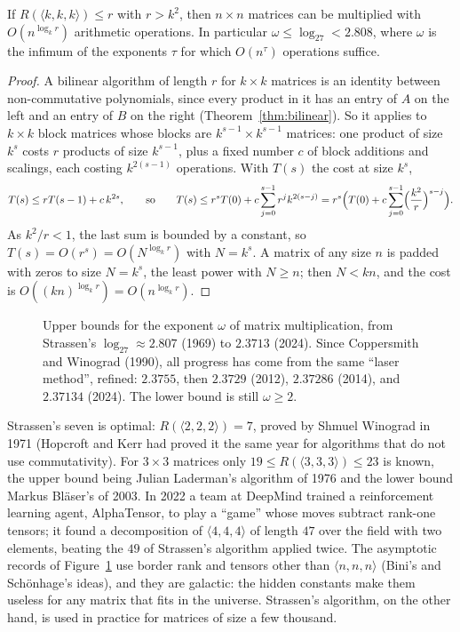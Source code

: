 \begin{theorem}\label{thm:omega}
If $R(\langle k,k,k\rangle)\le r$ with $r>k^2$, then $n\times n$ matrices can be multiplied with $O(n^{\log_kr})$ arithmetic operations.
In particular $\omega\le\log_27<2.808$, where $\omega$ is the infimum of the exponents $\tau$ for which $O(n^\tau)$ operations suffice.
\end{theorem}
\begin{proof}
A bilinear algorithm of length $r$ for $k\times k$ matrices is an identity between non-commutative polynomials, since every product
in it has an entry of $A$ on the left and an entry of $B$ on the right (Theorem~\ref{thm:bilinear}). So it applies to $k\times k$
block matrices whose blocks are $k^{s-1}\times k^{s-1}$ matrices: one product of size $k^s$ costs $r$ products of size $k^{s-1}$, plus
a fixed number $c$ of block additions and scalings, each costing $k^{2(s-1)}$ operations. With $T(s)$ the cost at size $k^s$,
\[
T(s)\le rT(s-1)+c\,k^{2s},\qquad\text{so}\qquad T(s)\le r^sT(0)+c\sum_{j=0}^{s-1}r^jk^{2(s-j)}=r^s\Bigl(T(0)+c\sum_{j=0}^{s-1}\Bigl(\frac{k^2}r
\Bigr)^{s-j}\Bigr).
\]
As $k^2/r<1$, the last sum is bounded by a constant, so $T(s)=O(r^s)=O(N^{\log_kr})$ with $N=k^s$. A matrix of any size $n$ is padded
with zeros to size $N=k^s$, the least power with $N\ge n$; then $N<kn$, and the cost is $O((kn)^{\log_kr})=O(n^{\log_kr})$.
\end{proof}

\begin{figure}[ht]
\centering
{}
\caption{Upper bounds for the exponent $\omega$ of matrix multiplication, from Strassen's $\log_27\approx2.807$ (1969) to $2.3713$
(2024). Since Coppersmith and Winograd (1990), all progress has come from the same ``laser method'', refined: $2.3755$, then
$2.3729$ (2012), $2.37286$ (2014), and $2.37134$ (2024). The lower bound is still $\omega\ge2$.}
\label{fig:omega}
\end{figure}

\begin{remark}
Strassen's seven is optimal: $R(\langle2,2,2\rangle)=7$, proved by Shmuel Winograd in 1971 (Hopcroft and Kerr had proved it the same
year for algorithms that do not use commutativity). For $3\times3$ matrices only $19\le R(\langle3,3,3\rangle)\le23$ is known, the upper
bound being Julian Laderman's algorithm of 1976 and the lower bound Markus Bl\"aser's of 2003. In 2022 a team at DeepMind trained
a reinforcement learning agent, AlphaTensor, to play a ``game'' whose moves subtract rank-one tensors; it found a decomposition of
$\langle4,4,4\rangle$ of length $47$ over the field with two elements, beating the $49$ of Strassen's algorithm applied twice. The
asymptotic records of Figure~\ref{fig:omega} use border rank and tensors other than $\langle n,n,n\rangle$ (Bini's and Sch\"onhage's
ideas), and they are galactic: the hidden constants make them useless for any matrix that fits in the universe. Strassen's
algorithm, on the other hand, is used in practice for matrices of size a few thousand.
\end{remark}

